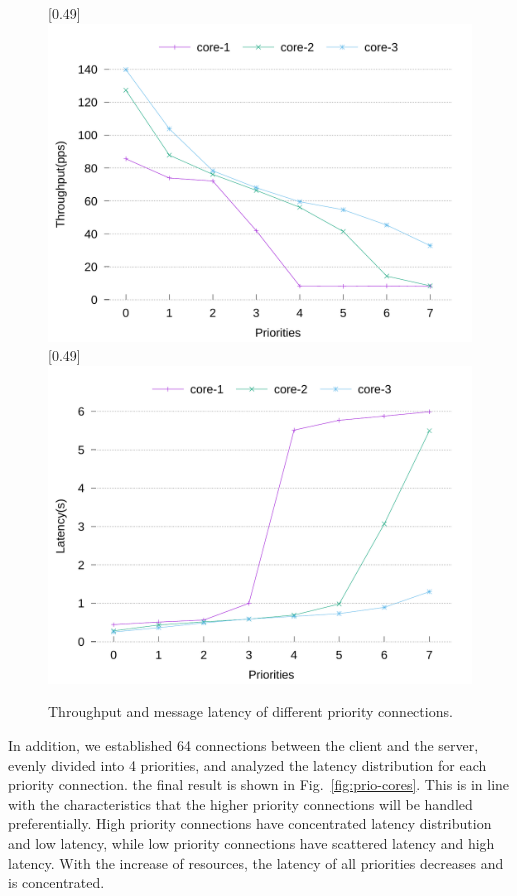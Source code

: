 \documentclass[sigconf,review,anonymous]{acmart}
\begin{document}
\begin{figure}[ht]
	\centering
	[0.49\linewidth]
	{
		\includegraphics[width=\linewidth]{assets/prio-throughput.pdf}
	}
	[0.49\linewidth]
	{
		\includegraphics[width=\linewidth]{assets/prio-latency.pdf}
	}
	\caption{Throughput and message latency of different priority connections.}
	\label{fig:prio-throughput-latency}
	\vspace{-1.0em}
\end{figure}

In addition, we established 64 connections between the client and the server, evenly divided into 4 priorities, and analyzed the latency distribution for each priority connection. the final result is shown in Fig.~\ref{fig:prio-cores}. This is in line with the characteristics that the higher priority connections will be handled preferentially. High priority connections have concentrated latency distribution and low latency, while low priority connections have scattered latency and high latency. With the increase of resources, the latency of all priorities decreases and is concentrated.
\end{document}
